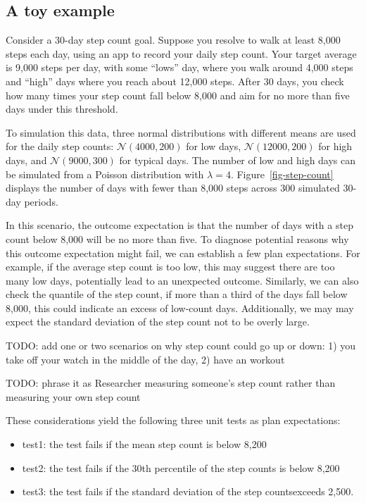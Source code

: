 \documentclass[
  12pt,
]{interact}
\providecommand{\tightlist}{%
  \setlength{\itemsep}{0pt}\setlength{\parskip}{0pt}}\usepackage{longtable,booktabs,array}
\begin{document}
\subsection{A toy example}\label{a-toy-example}

Consider a 30-day step count goal. Suppose you resolve to walk at least
8,000 steps each day, using an app to record your daily step count. Your
target average is 9,000 steps per day, with some ``lows'' day, where you
walk around 4,000 steps and ``high'' days where you reach about 12,000
steps. After 30 days, you check how many times your step count fall
below 8,000 and aim for no more than five days under this threshold.

To simulation this data, three normal distributions with different means
are used for the daily step counts: \(\mathcal{N}(4000, 200)\) for low
days, \(\mathcal{N}(12000, 200)\) for high days, and
\(\mathcal{N}(9000, 300)\) for typical days. The number of low and high
days can be simulated from a Poisson distribution with \(\lambda = 4\).
Figure~\ref{fig-step-count} displays the number of days with fewer than
8,000 steps across 300 simulated 30-day periods.

In this scenario, the outcome expectation is that the number of days
with a step count below 8,000 will be no more than five. To diagnose
potential reasons why this outcome expectation might fail, we can
establish a few plan expectations. For example, if the average step
count is too low, this may suggest there are too many low days,
potentially lead to an unexpected outcome. Similarly, we can also check
the quantile of the step count, if more than a third of the days fall
below 8,000, this could indicate an excess of low-count days.
Additionally, we may may expect the standard deviation of the step count
not to be overly large.

TODO: add one or two scenarios on why step count could go up or down: 1)
you take off your watch in the middle of the day, 2) have an workout

TODO: phrase it as Researcher measuring someone's step count rather than
measuring your own step count

These considerations yield the following three unit tests as plan
expectations:

\begin{itemize}
\tightlist
\item
  test1: the test fails if the mean step count is below 8,200
\item
  test2: the test fails if the 30th percentile of the step counts is
  below 8,200
\item
  test3: the test fails if the standard deviation of the step
  countsexceeds 2,500.
\end{itemize}
\end{document}
